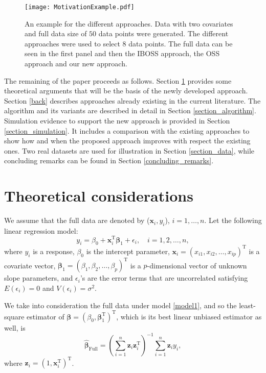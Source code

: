 \documentclass[12pt]{article}
\theoremstyle{definition}
\begin{document}
	\begin{figure}[!thb]
		\centering
		\texttt{[image: MotivationExample.pdf]}
		\caption{An example for the different approaches. Data with two covariates and full data size of $50$ data points were generated. The different approaches were used to select $8$ data points. The full data can be seen in the first panel and then the IBOSS approach, the OSS approach and our new approach.}
		\label{mot}
	\end{figure}
	
	The remaining of the paper proceeds as follows.
	Section \ref{theor} provides some theoretical arguments that will be the basis of the newly developed approach. Section \ref{back} describes approaches already existing in the current literature. The algorithm and its variants are described in detail in Section \ref{section_algorithm}. Simulation evidence to support the new approach is provided in Section \ref{section_simulation}. It includes a comparison with the existing approaches to show how and when the proposed approach improves with respect the existing ones. Two real datasets are used for illustration in Section \ref{section_data}, while concluding remarks can be found in Section \ref{concluding_remarks}.
	
	\section{Theoretical considerations}
	\label{theor}
	We assume that the full data are denoted by ($\textbf{x}_i, y_i$), $i=1,\ldots,n$. Let the following linear regression model:
	\begin{equation}\label{model1}
		y_i=\beta_0+\textbf{x}_i^\text{T}\boldsymbol{\beta}_1+\epsilon_i, \quad i=1,2,\ldots,n,
	\end{equation}
	where $y_i$ is a response, $\beta_0$ is the intercept parameter, $\textbf{x}_i=(x_{i1},x_{i2},\ldots,x_{ip})^{\text{T}}$ is a covariate vector, $\boldsymbol{\beta}_1=(\beta_1,\beta_2,\ldots,\beta_p)^{\text{T}}$ is a $p$-dimensional vector of unknown slope parameters, and $\epsilon_i$'s are the error terms that are uncorrelated satisfying $E(\epsilon_i)=0$ and $V(\epsilon_i)=\sigma^2$. 
	
	We take into consideration the full data under model \eqref{model1}, and so the least-square estimator of $\boldsymbol{\beta}=(\beta_0,\boldsymbol{\beta}_1^{\text{T}})^{\text{T}}$, which is its best linear unbiased estimator as well, is
	\begin{equation*}
		\hat{\boldsymbol{\beta}}_{\text{Full}}=\left(\sum_{i=1}^{n}\textbf{z}_i\textbf{z}_i^{\text{T}}\right)^{-1}\sum_{i=1}^{n}\textbf{z}_iy_i,
	\end{equation*}
	where $\textbf{z}_i=(1,\textbf{x}_i^\text{T})^\text{T}$.
	
\end{document}
